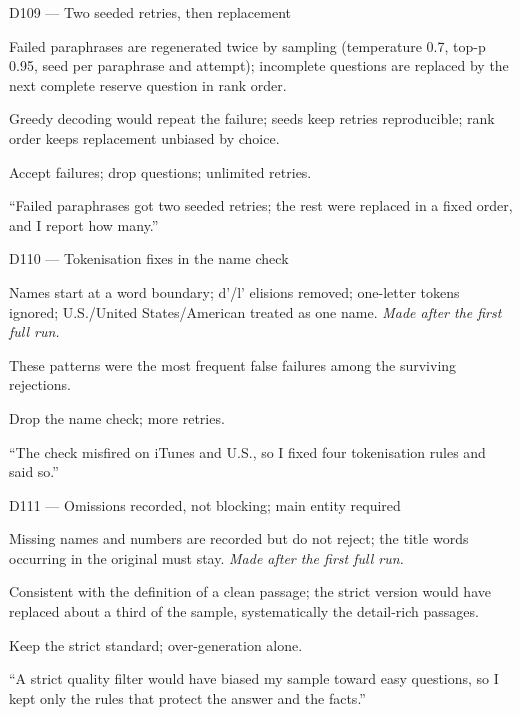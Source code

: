 \documentclass[11pt,a4paper]{report}
\begin{document}
\begin{decisionbox}{D109 --- Two seeded retries, then replacement}
\begin{description}[nosep, leftmargin=0pt]
  \item[Decision.] Failed paraphrases are regenerated twice by sampling (temperature 0.7, top-p 0.95, seed per paraphrase and attempt); incomplete questions are replaced by the next complete reserve question in rank order.
  \item[Why.] Greedy decoding would repeat the failure; seeds keep retries reproducible; rank order keeps replacement unbiased by choice.
  \item[Alternatives.] Accept failures; drop questions; unlimited retries.
  \item[Interview line.] ``Failed paraphrases got two seeded retries; the rest were replaced in a fixed order, and I report how many.''
\end{description}
\end{decisionbox}

\begin{decisionbox}{D110 --- Tokenisation fixes in the name check}
\begin{description}[nosep, leftmargin=0pt]
  \item[Decision.] Names start at a word boundary; d'/l' elisions removed; one-letter tokens ignored; U.S./United States/American treated as one name. \emph{Made after the first full run.}
  \item[Why.] These patterns were the most frequent false failures among the surviving rejections.
  \item[Alternatives.] Drop the name check; more retries.
  \item[Interview line.] ``The check misfired on iTunes and U.S., so I fixed four tokenisation rules and said so.''
\end{description}
\end{decisionbox}

\begin{decisionbox}{D111 --- Omissions recorded, not blocking; main entity required}
\begin{description}[nosep, leftmargin=0pt]
  \item[Decision.] Missing names and numbers are recorded but do not reject; the title words occurring in the original must stay. \emph{Made after the first full run.}
  \item[Why.] Consistent with the definition of a clean passage; the strict version would have replaced about a third of the sample, systematically the detail-rich passages.
  \item[Alternatives.] Keep the strict standard; over-generation alone.
  \item[Interview line.] ``A strict quality filter would have biased my sample toward easy questions, so I kept only the rules that protect the answer and the facts.''
\end{description}
\end{decisionbox}
\end{document}
